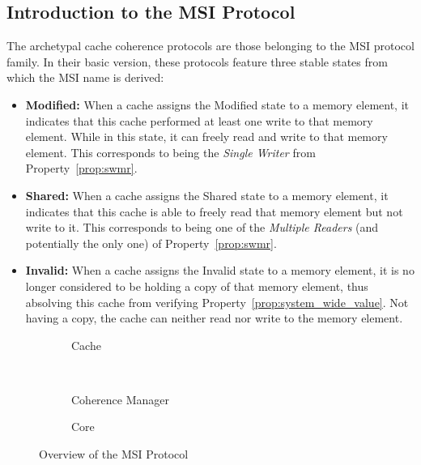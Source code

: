 \subsection{Introduction to the MSI Protocol}
\label{sec:intro_to_msi}
The archetypal cache coherence protocols are those belonging to the MSI
protocol family. In their basic version, these protocols feature three stable
states from which the MSI name is derived:
\begin{itemize}
\item \textbf{Modified:}
When a cache assigns the Modified state to a memory element, it indicates that
this cache performed at least one write to that memory element. While in this
state, it can freely read and write to that memory element. This corresponds
to being the \textit{Single Writer} from Property~\ref{prop:swmr}.

\item \textbf{Shared:}
When a cache assigns the Shared state to a memory element, it indicates that
this cache is able to freely read that memory element but not write to it. This
corresponds to being one of the \textit{Multiple Readers} (and potentially the
only one) of Property~\ref{prop:swmr}.

\item \textbf{Invalid:}
When a cache assigns the Invalid state to a memory element, it is no longer
considered to be holding a copy of that memory element, thus absolving this
cache from verifying Property~\ref{prop:system_wide_value}. Not having a copy,
the cache can neither read nor write to the memory element.
\end{itemize}

\stopallthesefloats
\begin{figure}
   \begin{center}
   \begin{subfigure}[b]{0.7\linewidth}
      
      \caption{Cache}
      \label{fig:general_msi_cc}
   \end{subfigure}
   \\
   \begin{subfigure}[b]{0.5\linewidth}
      
      \caption{Coherence Manager}
      \label{fig:general_msi_cmgr}
   \end{subfigure}
   \begin{subfigure}[b]{0.3\linewidth}
      
      \caption{Core}
      \label{fig:general_msi_cpu}
   \end{subfigure}
   \end{center}
   \caption{Overview of the MSI Protocol}
   \label{fig:general_msi}
\end{figure}


